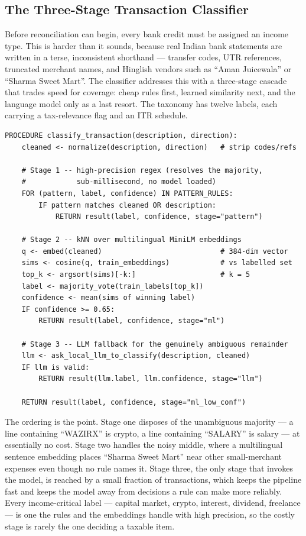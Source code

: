 \subsection{The Three-Stage Transaction Classifier}
Before reconciliation can begin, every bank credit must be assigned an income
type. This is harder than it sounds, because real Indian bank statements are
written in a terse, inconsistent shorthand --- transfer codes, UTR references,
truncated merchant names, and Hinglish vendors such as ``Aman Juicewala'' or
``Sharma Sweet Mart''. The classifier addresses this with a three-stage cascade
that trades speed for coverage: cheap rules first, learned similarity next, and
the language model only as a last resort. The taxonomy has twelve labels, each
carrying a tax-relevance flag and an ITR schedule.

\begin{lstlisting}[style=pseudo]
PROCEDURE classify_transaction(description, direction):
    cleaned <- normalize(description, direction)   # strip codes/refs

    # Stage 1 -- high-precision regex (resolves the majority,
    #            sub-millisecond, no model loaded)
    FOR (pattern, label, confidence) IN PATTERN_RULES:
        IF pattern matches cleaned OR description:
            RETURN result(label, confidence, stage="pattern")

    # Stage 2 -- kNN over multilingual MiniLM embeddings
    q <- embed(cleaned)                            # 384-dim vector
    sims <- cosine(q, train_embeddings)            # vs labelled set
    top_k <- argsort(sims)[-k:]                    # k = 5
    label <- majority_vote(train_labels[top_k])
    confidence <- mean(sims of winning label)
    IF confidence >= 0.65:
        RETURN result(label, confidence, stage="ml")

    # Stage 3 -- LLM fallback for the genuinely ambiguous remainder
    llm <- ask_local_llm_to_classify(description, cleaned)
    IF llm is valid:
        RETURN result(llm.label, llm.confidence, stage="llm")

    RETURN result(label, confidence, stage="ml_low_conf")
\end{lstlisting}

The ordering is the point. Stage one disposes of the unambiguous majority --- a
line containing ``WAZIRX'' is crypto, a line containing ``SALARY'' is salary ---
at essentially no cost. Stage two handles the noisy middle, where a multilingual
sentence embedding places ``Sharma Sweet Mart'' near other small-merchant
expenses even though no rule names it. Stage three, the only stage that invokes
the model, is reached by a small fraction of transactions, which keeps the
pipeline fast and keeps the model away from decisions a rule can make more
reliably. Every income-critical label --- capital market, crypto, interest,
dividend, freelance --- is one the rules and the embeddings handle with high
precision, so the costly stage is rarely the one deciding a taxable item.

